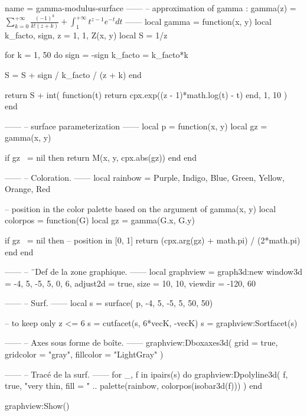 \documentclass[10pt]{standalone}
\begin{document}
\begin{luadraw}{name = gamma-modulus-surface}
------
-- approximation of gamma : gamma(z) = $\sum_{k=0}^{+\infty} \frac{(-1)^k}{k!(z+k)} + \int_1^{+\infty} t^{z-1}e^{-t}dt$
------
local gamma = function(x, y)
  local k_facto, sign, z = 1, 1, Z(x, y)
  local S = 1/z

  for k = 1, 50 do
    sign    = -sign
    k_facto = k_facto*k

    S = S + sign / k_facto / (z + k)
  end

  return S + int(
    function(t)
      return cpx.exp((z - 1)*math.log(t) - t)
    end,
    1, 10
  )
end

------
-- surface parameterization
------
local p = function(x, y)
  local gz = gamma(x, y)

  if gz ~=  nil then
    return M(x, y, cpx.abs(gz))
  end
end

------
-- Coloration.
------
local rainbow = {Purple, Indigo, Blue, Green, Yellow, Orange, Red}

-- position in the color palette based on the argument of gamma(x, y)
local colorpos = function(G)
  local gz = gamma(G.x, G.y)

  if gz ~=  nil then
    -- position in [0, 1]
    return (cpx.arg(gz) + math.pi) / (2*math.pi)
  end
end

------
-- ¨Def de la zone graphique.
------
local graphview = graph3d:new{
  window3d = {-4, 5, -5, 5, 0, 6},
  adjust2d = true,
  size     = {10, 10},
  viewdir  = {-120, 60}
}

------
-- Surf.
------
local s = surface(
  p,
  -4, 5, -5, 5,
  {50, 50})

-- to keep only z <=  6
s = cutfacet(s, {6*vecK, -vecK})
s = graphview:Sortfacet(s)

------
-- Axes sous forme de boîte.
------
graphview:Dboxaxes3d({
  grid      = true,
  gridcolor = "gray",
  fillcolor = "LightGray"
})


------
-- Tracé de la surf.
------
for _, f in ipairs(s) do
  graphview:Dpolyline3d(
    f,
    true,
       "very thin, fill = "
    .. palette(rainbow, colorpos(isobar3d(f)))
  )
end

graphview:Show()
\end{luadraw}
\end{document}
